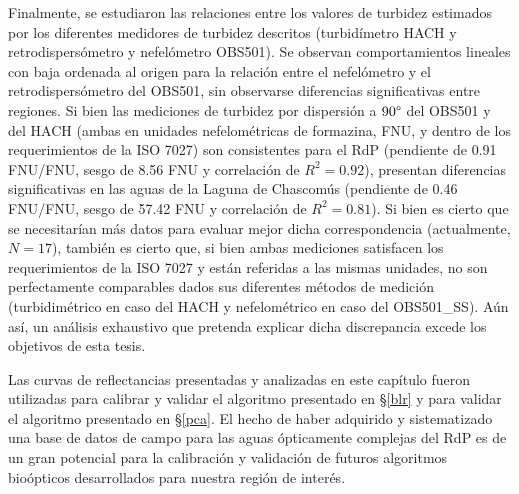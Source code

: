     Finalmente, se estudiaron las relaciones entre los valores de turbidez estimados por los diferentes medidores de turbidez descritos (turbidímetro HACH y retrodispersómetro y nefelómetro OBS501). Se observan comportamientos lineales con baja ordenada al origen para la relación entre el nefelómetro y el retrodispersómetro del OBS501, sin observarse diferencias significativas entre regiones. Si bien las mediciones de turbidez por dispersión a $90\degree$ del OBS501 y del HACH (ambas en unidades nefelométricas de formazina, FNU, y dentro de los requerimientos de la ISO 7027) son consistentes para el RdP (pendiente de 0.91 FNU/FNU, sesgo de 8.56 FNU y correlación de $R^{2}=0.92$), presentan diferencias significativas en las aguas de la Laguna de Chascomús (pendiente de 0.46 FNU/FNU, sesgo de 57.42 FNU y correlación de $R^{2}=0.81$). Si bien es cierto que se necesitarían más datos para evaluar mejor dicha correspondencia (actualmente, $N = 17$), también es cierto que, si bien ambas mediciones satisfacen los requerimientos de la ISO 7027 y están referidas a las mismas unidades, no son perfectamente comparables dados sus diferentes métodos de medición (turbidimétrico en caso del HACH y nefelométrico en caso del OBS501\_SS). Aún así, un análisis exhaustivo que pretenda explicar dicha discrepancia excede los objetivos de esta tesis.
    
    Las curvas de reflectancias presentadas y analizadas en este capítulo fueron utilizadas para calibrar y validar el algoritmo presentado en \S \ref{blr} y para validar el algoritmo presentado en \S \ref{pca}. El hecho de haber adquirido y sistematizado una base de datos de campo para las aguas ópticamente complejas del RdP es de un gran potencial para la calibración y validación de futuros algoritmos bioópticos desarrollados para nuestra región de interés.